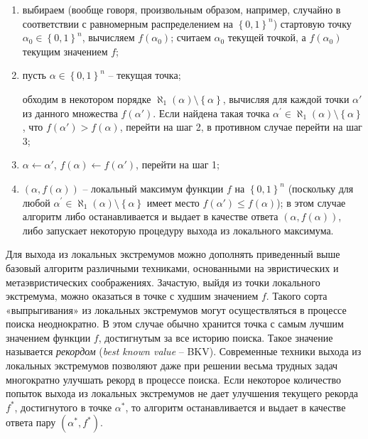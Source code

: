 \begin{enumerate}
\item
  выбираем (вообще говоря, произвольным образом, например, случайно в соответствии с равномерным распределением на $\left\{ 0,1 \right\}^{n}$) стартовую точку $\alpha_{0} \in \left\{ 0,1 \right\}^{n}$, вычисляем $f\left( \alpha_{0} \right)$; считаем $\alpha_{0}$ текущей точкой, а $f \left( \alpha_{0} \right)$ текущим значением $f$;

\item
  пусть $\alpha \in \left\{ 0,1 \right\}^{n}$ \--- текущая точка;

  обходим в некотором порядке $\aleph_{1}(\alpha)\setminus\left\{ \alpha \right\}$, вычисляя для каждой точки $\alpha'$ из данного множества $f(\alpha')$. Если найдена такая точка $\alpha^{'} \in \aleph_{1}(\alpha) \setminus \left\{ \alpha \right\}$, что $f(\alpha') > f(\alpha)$, перейти на шаг 2, в противном случае перейти на шаг 3;

\item
  $\alpha \gets \alpha'$, $f(\alpha) \gets f(\alpha')$, перейти на шаг 1;

\item
  $\left( \alpha,f(\alpha) \right)$ \--- локальный максимум функции $f$ на $\left\{ 0,1 \right\}^{n}$ (поскольку для любой $\alpha^{'} \in \aleph_{1}(\alpha)\setminus \left\{ \alpha \right\}$ имеет место $f(\alpha') \leq f(\alpha)$); в этом случае алгоритм либо останавливается и выдает в качестве ответа $\left( \alpha, f(\alpha) \right)$, либо запускает некоторую процедуру выхода из локального максимума.
\end{enumerate}

Для выхода из локальных экстремумов можно дополнять приведенный выше базовый алгоритм различными техниками, основанными на эвристических и метаэвристических соображениях. Зачастую, выйдя из точки локального экстремума, можно оказаться в точке с худшим значением $f$. Такого сорта «выпрыгивания» из локальных экстремумов могут осуществляться в процессе поиска неоднократно. В этом случае обычно хранится точка с самым лучшим значением функции $f$, достигнутым за все историю поиска. Такое значение называется \textit{рекордом} (\textit{best known value} \--- BKV). Современные техники выхода из локальных экстремумов позволяют даже при решении весьма трудных задач многократно улучшать рекорд в процессе поиска. Если некоторое количество попыток выхода из локальных экстремумов не дает улучшения текущего рекорда $f^{*}$, достигнутого в точке $\alpha^{*}$, то алгоритм останавливается и выдает в качестве ответа пару $\left( \alpha^{*},f^{*} \right)$.

